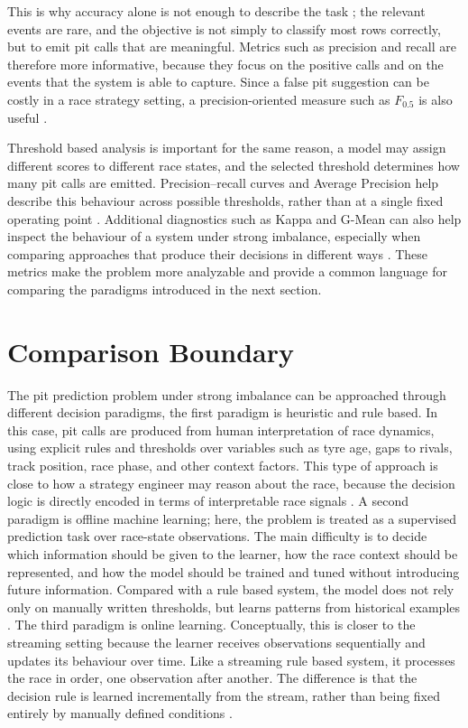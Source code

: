 This is why accuracy alone is not enough to describe the task \citep{saito2015prroc,davis2006relationship,he2009imbalanced};
the relevant events are rare, and the objective is not simply to classify most rows correctly, but to emit pit calls that are meaningful.
Metrics such as precision and recall are therefore more informative, because they focus on the positive calls and on the events that the system is able to capture.
Since a false pit suggestion can be costly in a race strategy setting, a precision-oriented measure such as $F_{0.5}$ is also useful \citep{elkan2001costsensitive}.

Threshold based analysis is important for the same reason,
a model may assign different scores to different race states, and the selected threshold determines how many pit calls are emitted.
Precision--recall curves and Average Precision help describe this behaviour across possible thresholds, rather than at a single fixed operating point \citep{saito2015prroc,davis2006relationship}.
Additional diagnostics such as Kappa and G-Mean can also help inspect the behaviour of a system under strong imbalance, especially when comparing approaches that produce
their decisions in different ways \citep{cohen1960kappa,he2009imbalanced}.
These metrics make the problem more analyzable and provide a common language for comparing the paradigms introduced in the next section.

\section{Comparison Boundary}

The pit prediction problem under strong imbalance can be approached through different decision paradigms,
the first paradigm is heuristic and rule based.
In this case, pit calls are produced from human interpretation of race dynamics, using explicit rules and thresholds over variables such as tyre age, gaps to rivals, track position,
race phase, and other context factors.
This type of approach is close to how a strategy engineer may reason about the race, because the decision logic is directly encoded in terms of interpretable race signals \citep{heilmeier2020race}.
A second paradigm is offline machine learning;
here, the problem is treated as a supervised prediction task over race-state observations.
The main difficulty is to decide which information should be given to the learner, how the race context should be represented, and how the model should be trained and tuned
without introducing future information.
Compared with a rule based system, the model does not rely only on manually written thresholds, but learns patterns from historical examples \citep{chen2016xgboost,hettmann2024datatopodium,sasikumar2025pitstop,dinh2025gradient}.
The third paradigm is online learning.
Conceptually, this is closer to the streaming setting because the learner receives observations sequentially and updates its behaviour over time.
Like a streaming rule based system, it processes the race in order, one observation after another.
The difference is that the decision rule is learned incrementally from the stream, rather than being fixed entirely by manually defined conditions \citep{bifet2010moa,oza2005boosting,bifet2007adwin}.


